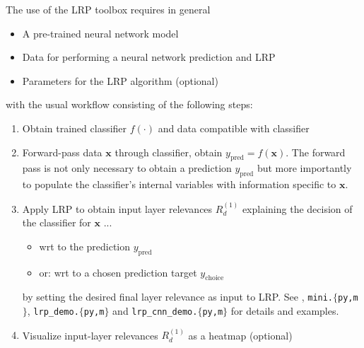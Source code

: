 \documentclass[a4wide]{article}
\newcommand{\x}{\boldsymbol{x}}
\begin{document}
The use of the LRP toolbox requires in general
\begin{itemize}
\item A pre-trained neural network model
\item Data for performing a neural network prediction and LRP
\item Parameters for the LRP algorithm (optional)
\end{itemize}
with the usual workflow consisting of the following steps:
\begin{enumerate}
\item Obtain trained classifier $f(\cdot)$ and data compatible with classifier
\item Forward-pass data $\x$ through classifier, obtain $y_{\text{pred}} = f(\x)$. The forward pass is not only necessary to obtain a prediction $y_{\text{pred}}$ but more importantly to populate the classifier's internal variables with information specific to $\x$.
\item Apply LRP to obtain input layer relevances $R^{(1)}_d$ explaining the decision of the classifier for $\x$ ...
	\begin{itemize}
		\item wrt to the prediction $y_{\text{pred}}$ 
		\item or: wrt to a chosen prediction target $y_{\text{choice}}$
	\end{itemize}
	by setting the desired final layer relevance as input to LRP. See \cite{bach15}, \texttt{mini.$\lbrace$py,m$\rbrace$}, \texttt{lrp\_demo.$\lbrace$py,m$\rbrace$} and \texttt{lrp\_cnn\_demo.$\lbrace$py,m$\rbrace$} for details and examples.
\item Visualize input-layer relevances $R_d^{(1)}$ as a heatmap (optional)
\end{enumerate}
\end{document}
